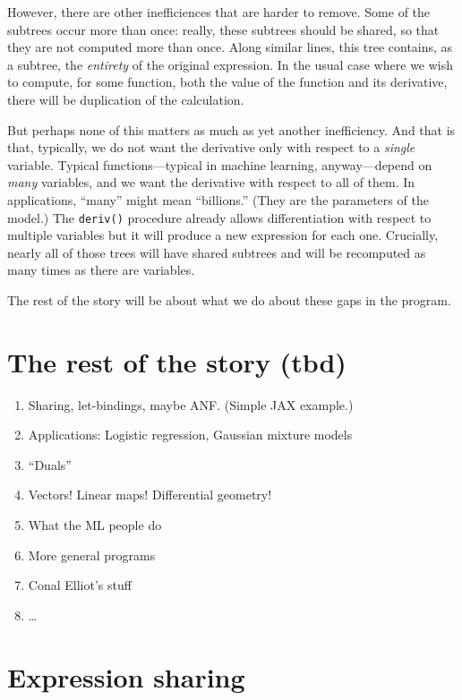 \documentclass[11pt, a4paper]{article}
\newcommand{\cd}[1]{\texttt{#1}}
\begin{document}
However, there are other inefficiences that are harder to remove. Some
of the subtrees occur more than once: really, these subtrees should be
shared, so that they are not computed more than once. Along similar
lines, this tree contains, as a subtree, the \emph{entirety} of the
original expression. In the usual case where we wish to compute, for
some function, both the value of the function and its derivative,
there will be duplication of the calculation.

But perhaps none of this matters as much as yet another
inefficiency. And that is that, typically, we do not want the
derivative only with respect to a \emph{single} variable. Typical
functions---typical in machine learning, anyway---depend on \emph{many}
variables, and we want the derivative with respect to all of them. In
applications, ``many'' might mean ``billions.'' (They are the
parameters of the model.) The \cd{deriv()} procedure already allows
differentiation with respect to multiple variables but it will produce
a new expression for each one. Crucially, nearly all of those trees
will have shared subtrees and will be recomputed as many times as
there are variables.

The rest of the story will be about what we do about these gaps in the
program.

\section{The rest of the story (tbd)}

\begin{enumerate}
\item Sharing, let-bindings, maybe ANF. (Simple JAX example.)
\item Applications: Logistic regression, Gaussian mixture models
\item ``Duals''
\item Vectors! Linear maps! Differential geometry!
\item What the ML people do 
\item More general programs
\item Conal Elliot's stuff
\item \dots
\end{enumerate}


\section{Expression sharing}
\end{document}
